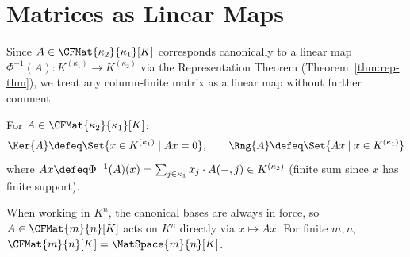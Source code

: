 
\newpage
\section{Matrices as Linear Maps}
\label{sec:mat-as-lin-maps}

\begin{remark}
    Since $A \in \CFMat{\kappa_2}{\kappa_1}[K]$ corresponds canonically to a linear map
    $\Phi^{-1}(A): K^{(\kappa_1)} \to K^{(\kappa_2)}$ via the Representation Theorem
    (Theorem~\ref{thm:rep-thm}), we treat any column-finite matrix as a linear map without
    further comment.
\end{remark}

\begin{definition}
\label{def:mat-ker-rng}
    For $A \in \CFMat{\kappa_2}{\kappa_1}[K]$:
    \[
        \Ker{A} \defeq \Set{x \in K^{(\kappa_1)} \mid Ax = 0}, \qquad
        \Rng{A} \defeq \Set{Ax \mid x \in K^{(\kappa_1)}}
    \]
    where $Ax \defeq \Phi^{-1}(A)(x) = \sum_{j \in \kappa_1} x_j \cdot A(-,j) \in K^{(\kappa_2)}$
    (finite sum since $x$ has finite support).
\end{definition}

\begin{remark}
    When working in $K^n$, the canonical bases are always in force, so
    $A \in \CFMat{m}{n}[K]$ acts on $K^n$ directly via $x \mapsto Ax$.
    For finite $m, n$, $\CFMat{m}{n}[K] = \MatSpace{m}{n}[K]$.
\end{remark}

